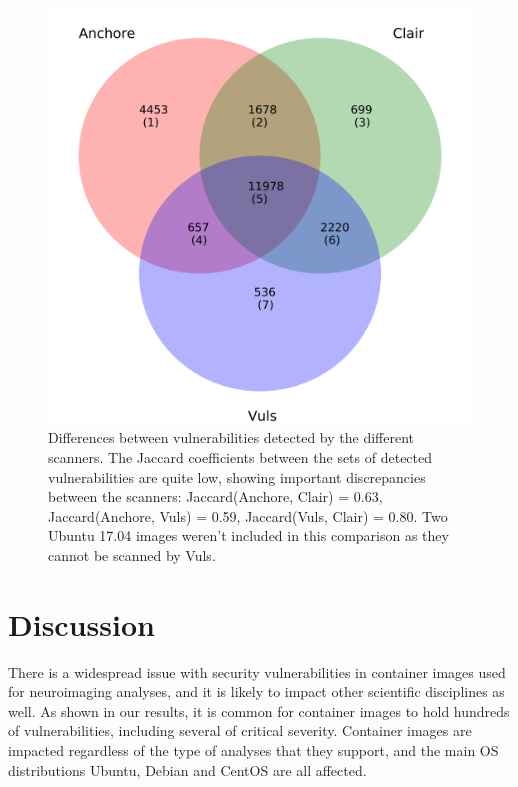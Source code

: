 \documentclass[a4paper,num-refs]{oup-contemporary}
\begin{document}
\begin{figure}
\includegraphics[width=\columnwidth]{Figures/venn.pdf}
\caption{\label{fig:venn} Differences between vulnerabilities detected
by the different scanners. The Jaccard coefficients between the sets of
detected vulnerabilities are quite low, showing important discrepancies
between the scanners: Jaccard(Anchore, Clair) = 0.63, Jaccard(Anchore, Vuls) =
0.59, Jaccard(Vuls, Clair) = 0.80. Two Ubuntu 17.04 images weren't
included in this comparison as they cannot be scanned by Vuls.}
\end{figure}


\section{Discussion}

There is a widespread issue with security vulnerabilities in container
images used for neuroimaging analyses, and it is likely to impact other
scientific disciplines as well. As shown in our results, it is common for container images
to hold hundreds of vulnerabilities, including several of critical
severity. Container images are impacted regardless of the type of analyses
that they support, and the main OS distributions Ubuntu, Debian and CentOS
are all affected.
\end{document}
